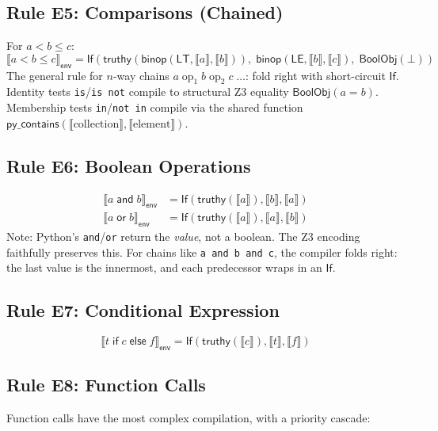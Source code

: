 \documentclass[11pt,a4paper]{report}
\theoremstyle{definition}
\theoremstyle{plain}
\newcommand{\den}[1]{\llbracket #1 \rrbracket}
\begin{document}
\subsection{Rule E5: Comparisons (Chained)}
For $a < b \leq c$:
\[
  \den{a < b \leq c}_\mathsf{env} = \mathsf{If}(
    \mathsf{truthy}(\mathsf{binop}(\mathsf{LT}, \den{a}, \den{b})),\;
    \mathsf{binop}(\mathsf{LE}, \den{b}, \den{c}),\;
    \mathsf{BoolObj}(\bot))
\]
The general rule for $n$-way chains $a \;\mathrm{op}_1\; b
\;\mathrm{op}_2\; c \;\ldots$:
fold right with short-circuit $\mathsf{If}$.  Identity tests
\texttt{is}/\texttt{is not} compile to structural Z3 equality
$\mathsf{BoolObj}(a = b)$.  Membership tests \texttt{in}/\texttt{not in}
compile via the shared function
$\mathsf{py\_contains}(\den{\mathrm{collection}}, \den{\mathrm{element}})$.

\subsection{Rule E6: Boolean Operations}
\begin{align}
  \den{a \;\mathsf{and}\; b}_\mathsf{env} &= \mathsf{If}(
    \mathsf{truthy}(\den{a}), \den{b}, \den{a}) \\
  \den{a \;\mathsf{or}\; b}_\mathsf{env} &= \mathsf{If}(
    \mathsf{truthy}(\den{a}), \den{a}, \den{b})
\end{align}
Note: Python's \texttt{and}/\texttt{or} return the \emph{value}, not
a boolean.  The Z3 encoding faithfully preserves this.  For chains
like \texttt{a and b and c}, the compiler folds right:
the last value is the innermost, and each predecessor wraps in an
$\mathsf{If}$.

\subsection{Rule E7: Conditional Expression}
\[
  \den{t \;\mathsf{if}\; c \;\mathsf{else}\; f}_\mathsf{env} =
    \mathsf{If}(\mathsf{truthy}(\den{c}), \den{t}, \den{f})
\]

\subsection{Rule E8: Function Calls}

Function calls have the most complex compilation, with a priority
cascade:
\end{document}
